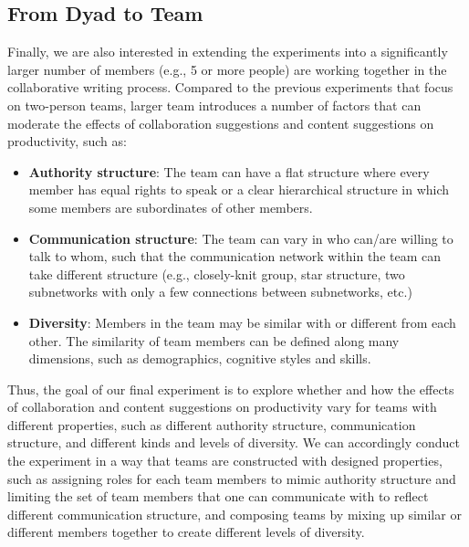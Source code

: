  


\subsection{From Dyad to Team}
\label{sec:exp4}
Finally, we are also interested in extending the experiments into 
a significantly larger number of members (e.g., 5 or more people) are working together in the collaborative writing process. Compared to the previous experiments that focus on two-person teams, larger team introduces a number of factors that can 
moderate the effects of collaboration suggestions and content suggestions on %
productivity, such as:
\begin{itemize}[leftmargin=*,noitemsep,topsep=0pt,parsep=0pt,partopsep=0pt]
\item{\bf Authority structure}: The team can have a flat structure where every member has equal rights to speak or a clear hierarchical structure in which some members are subordinates of other members.
\item{\bf Communication structure}: The team can vary in who can/are willing to talk to whom, such that the communication network within the team can take different structure (e.g., closely-knit group, star structure, two subnetworks with only a few connections between subnetworks, etc.) 
\item{\bf Diversity}: Members in the team may be similar with or different from each other. The similarity of team members can be defined along many dimensions, such as demographics, cognitive styles and skills.
\end{itemize}

Thus, the goal of our final experiment is to explore whether and how the effects of collaboration and content suggestions on productivity vary for teams with different properties, such as different authority structure, communication structure, and different kinds and levels of diversity. 
We can accordingly conduct the experiment in a way that teams are constructed with designed properties, such as assigning roles for each team members to mimic authority structure and limiting the set of team members that one can communicate with to reflect different communication structure, and composing teams by mixing up similar or different members together to create different levels of diversity. 
